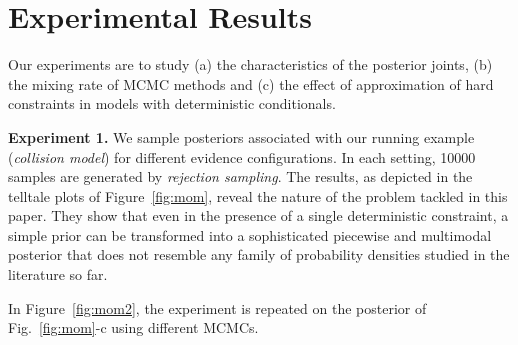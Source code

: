 \documentclass{article}
\begin{document}
\section{Experimental Results}
\label{sect:experimental.results}
Our experiments are to study
(a) the characteristics of the posterior joints, 
(b) the mixing rate of MCMC methods and
(c) the effect of approximation of hard constraints
in models with deterministic conditionals. 


\textbf{Experiment 1.} We sample posteriors associated with our running example (\emph{collision model}) for different evidence configurations.
In each setting, 10000 samples are generated by \emph{rejection sampling}.
The results, as depicted in the telltale plots of Figure~\ref{fig:mom}, reveal the nature of the problem tackled in this paper.
They show that even in the presence of a single deterministic constraint, 
a simple prior can be transformed into a sophisticated piecewise and multimodal posterior that does not resemble any family of 
probability densities studied in the literature so far. 

In Figure~\ref{fig:mom2}, the experiment is repeated on the posterior of 
Fig.~\ref{fig:mom}-c using different MCMCs.%
\end{document}
